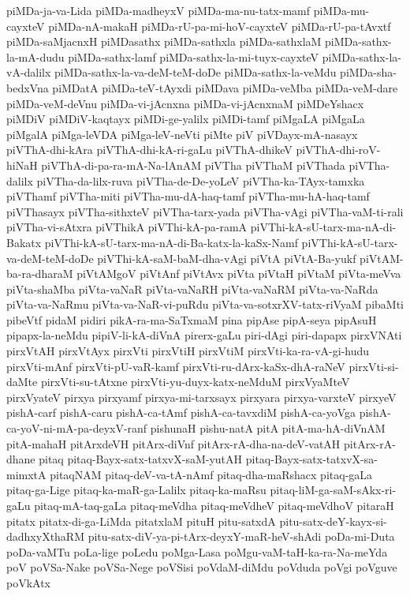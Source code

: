 {piMDa-ja-va-Lida
piMDa-madheyxV
piMDa-ma-nu-tatx-mamf
piMDa-mu-cayxteV
piMDa-nA-makaH
piMDa-rU-pa-mi-hoV-cayxteV
piMDa-rU-pa-tAvxtf
piMDa-saMjacnxH
piMDasathx
piMDa-sathxla
piMDa-sathxlaM
piMDa-sathx-la-mA-dudu
piMDa-sathx-lamf
piMDa-sathx-la-mi-tuyx-cayxteV
piMDa-sathx-la-vA-dalilx
piMDa-sathx-la-va-deM-teM-doDe
piMDa-sathx-la-veMdu
piMDa-sha-bedxVna
piMDatA
piMDa-teV-tAyxdi
piMDava
piMDa-veMba
piMDa-veM-dare
piMDa-veM-deVnu
piMDa-vi-jAcnxna
piMDa-vi-jAcnxnaM
piMDeYshacx
piMDiV
piMDiV-kaqtayx
piMDi-ge-yalilx
piMDi-tamf
piMgaLA
piMgaLa
piMgalA
piMga-leVDA
piMga-leV-neVti
piMte
piV
piVDayx-mA-nasayx
piVThA-dhi-kAra
piVThA-dhi-kA-ri-gaLu
piVThA-dhikeV
piVThA-dhi-roV-hiNaH
piVThA-di-pa-ra-mA-Na-lAnAM
piVTha
piVThaM
piVThada
piVTha-dalilx
piVTha-da-lilx-ruva
piVTha-de-De-yoLeV
piVTha-ka-TAyx-tamxka
piVThamf
piVTha-miti
piVTha-mu-dA-haq-tamf
piVTha-mu-hA-haq-tamf
piVThasayx
piVTha-sithxteV
piVTha-tarx-yada
piVTha-vAgi
piVTha-vaM-ti-rali
piVTha-vi-sAtxra
piVThikA
piVThi-kA-pa-ramA
piVThi-kA-sU-tarx-ma-nA-di-Bakatx
piVThi-kA-sU-tarx-ma-nA-di-Ba-katx-la-kaSx-Namf
piVThi-kA-sU-tarx-va-deM-teM-doDe
piVThi-kA-saM-baM-dha-vAgi
piVtA
piVtA-Ba-yukf
piVtAM-ba-ra-dharaM
piVtAMgoV
piVtAnf
piVtAvx
piVta
piVtaH
piVtaM
piVta-meVva
piVta-shaMba
piVta-vaNaR
piVta-vaNaRH
piVta-vaNaRM
piVta-va-NaRda
piVta-va-NaRmu
piVta-va-NaR-vi-puRdu
piVta-va-sotxrXV-tatx-riVyaM
pibaMti
pibeVtf
pidaM
pidiri
pikA-ra-ma-SaTxmaM
pina
pipAse
pipA-seya
pipAsuH
pipapx-la-neMdu
pipiV-li-kA-diVnA
pirerx-gaLu
piri-dAgi
piri-dapapx
pirxVNAti
pirxVtAH
pirxVtAyx
pirxVti
pirxVtiH
pirxVtiM
pirxVti-ka-ra-vA-gi-hudu
pirxVti-mAnf
pirxVti-pU-vaR-kamf
pirxVti-ru-dArx-kaSx-dhA-raNeV
pirxVti-si-daMte
pirxVti-su-tAtxne
pirxVti-yu-duyx-katx-neMduM
pirxVyaMteV
pirxVyateV
pirxya
pirxyamf
pirxya-mi-tarxsayx
pirxyara
pirxya-varxteV
pirxyeV
pishA-carf
pishA-caru
pishA-ca-tAmf
pishA-ca-tavxdiM
pishA-ca-yoVga
pishA-ca-yoV-ni-mA-pa-deyxV-ranf
pishunaH
pishu-natA
pitA
pitA-ma-hA-diVnAM
pitA-mahaH
pitArxdeVH
pitArx-diVnf
pitArx-rA-dha-na-deV-vatAH
pitArx-rA-dhane
pitaq
pitaq-Bayx-satx-tatxvX-saM-yutAH
pitaq-Bayx-satx-tatxvX-sa-mimxtA
pitaqNAM
pitaq-deV-va-tA-nAmf
pitaq-dha-maRshacx
pitaq-gaLa
pitaq-ga-Lige
pitaq-ka-maR-ga-Lalilx
pitaq-ka-maRsu
pitaq-liM-ga-saM-sAkx-ri-gaLu
pitaq-mA-taq-gaLa
pitaq-meVdha
pitaq-meVdheV
pitaq-meVdhoV
pitaraH
pitatx
pitatx-di-ga-LiMda
pitatxlaM
pituH
pitu-satxdA
pitu-satx-deY-kayx-si-dadhxyXthaRM
pitu-satx-diV-ya-pi-tArx-deyxY-maR-heV-shAdi
poDa-mi-Duta
poDa-vaMTu
poLa-lige
poLedu
poMga-Lasa
poMgu-vaM-taH-ka-ra-Na-meYda
poV
poVSa-Nake
poVSa-Nege
poVSisi
poVdaM-diMdu
poVduda
poVgi
poVguve
poVkAtx
}
